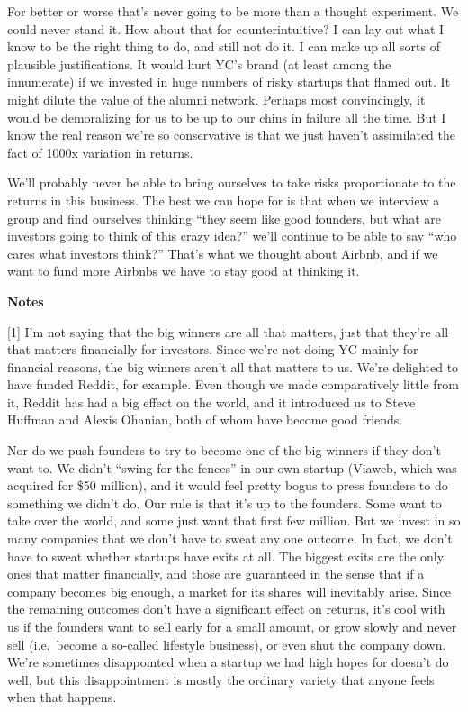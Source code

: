 For better or worse that's never going to be more than a thought
experiment. We could never stand it. How about that for
counterintuitive? I can lay out what I know to be the right thing to do,
and still not do it. I can make up all sorts of plausible
justifications. It would hurt YC's brand (at least among the innumerate)
if we invested in huge numbers of risky startups that flamed out. It
might dilute the value of the alumni network. Perhaps most convincingly,
it would be demoralizing for us to be up to our chins in failure all the
time. But I know the real reason we're so conservative is that we just
haven't assimilated the fact of 1000x variation in returns.

We'll probably never be able to bring ourselves to take risks
proportionate to the returns in this business. The best we can hope for
is that when we interview a group and find ourselves thinking ``they
seem like good founders, but what are investors going to think of this
crazy idea?'' we'll continue to be able to say ``who cares what
investors think?'' That's what we thought about Airbnb, and if we want
to fund more Airbnbs we have to stay good at thinking it.

\textbf{Notes}

{[}1{]} I'm not saying that the big winners are all that matters, just
that they're all that matters financially for investors. Since we're not
doing YC mainly for financial reasons, the big winners aren't all that
matters to us. We're delighted to have funded Reddit, for example. Even
though we made comparatively little from it, Reddit has had a big effect
on the world, and it introduced us to Steve Huffman and Alexis Ohanian,
both of whom have become good friends.

Nor do we push founders to try to become one of the big winners if they
don't want to. We didn't ``swing for the fences'' in our own startup
(Viaweb, which was acquired for \$50 million), and it would feel pretty
bogus to press founders to do something we didn't do. Our rule is that
it's up to the founders. Some want to take over the world, and some just
want that first few million. But we invest in so many companies that we
don't have to sweat any one outcome. In fact, we don't have to sweat
whether startups have exits at all. The biggest exits are the only ones
that matter financially, and those are guaranteed in the sense that if a
company becomes big enough, a market for its shares will inevitably
arise. Since the remaining outcomes don't have a significant effect on
returns, it's cool with us if the founders want to sell early for a
small amount, or grow slowly and never sell (i.e.~become a so-called
lifestyle business), or even shut the company down. We're sometimes
disappointed when a startup we had high hopes for doesn't do well, but
this disappointment is mostly the ordinary variety that anyone feels
when that happens.

